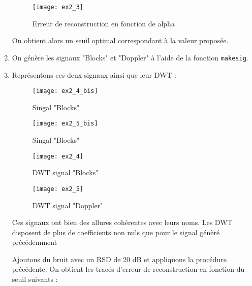 \documentclass[12pt,a4paper,titlepage]{article}
\begin{document}
\begin{enumerate}
{                \begin{figure}[H]
                    \caption{Erreur de reconstruction en fonction de alpha}
                    \texttt{[image: ex2\_3]}
                    \centering
                \end{figure}

                On obtient alors un seuil optimal correspondant à la valeur proposée.
            }

        \item{On génère les signaux "Blocks" et "Doppler" à l'aide de la
            fonction \texttt{makesig}.}

        \item{Représentons ces deux signaux ainsi que leur DWT :

                \begin{figure}[H]
                    \caption{Singal "Blocks"}
                    \texttt{[image: ex2\_4\_bis]}
                    \centering
                \end{figure}

                \begin{figure}[H]
                    \caption{Singal "Blocks"}
                    \texttt{[image: ex2\_5\_bis]}
                    \centering
                \end{figure}

                \begin{figure}[H]
                    \caption{DWT signal "Blocks"}
                    \texttt{[image: ex2\_4]}
                    \centering
                \end{figure}

                \begin{figure}[H]
                    \caption{DWT signal "Doppler"}
                    \texttt{[image: ex2\_5]}
                    \centering
                \end{figure}

                Ces signaux ont bien des allures cohérentes avec leurs noms. Les DWT disposent
                de plus de coefficients non nuls que pour le signal génèré précédemment

                Ajoutons du bruit avec un RSD de 20 dB et appliquons la
                procédure précédente. On obtient les tracés d'erreur de
                reconstruction en fonction du seuil suivants :

}
\end{enumerate}
\end{document}
